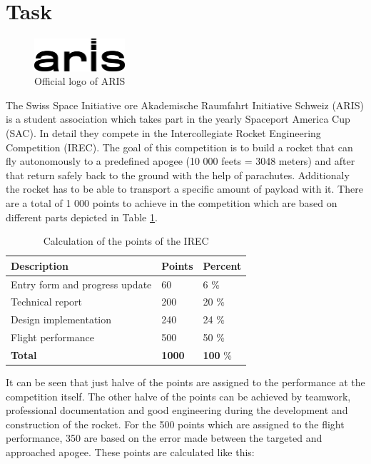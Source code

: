 
 \section{Task}

 \begin{figure}[h!]
 \centering
 \includegraphics[width=0.3\textwidth]{./Pictures/ARIS_logo.png}
 \caption{Official logo of ARIS \cite{ARIS}}
 \label{fig:ArisLogo}
\end{figure}

 The Swiss Space Initiative ore Akademische Raumfahrt Initiative Schweiz (ARIS) is a student association which takes part in the yearly Spaceport America Cup (SAC).
 In detail they compete in the Intercollegiate Rocket Engineering Competition (IREC).
 The goal of this competition is to build a rocket that can fly autonomously to a predefined apogee (10 000 feets = 3048 meters) and after that return safely back to the ground with the help of parachutes.
 Additionaly the rocket has to be able to transport a specific amount of payload with it.
 There are a total of 1 000 points to achieve in the competition which are based on different parts depicted in Table \ref{tab:CompetitionCalculation}.

\begin{table}[h]
\centering
\begin{tabular}{|l|l|l|}\hline
{\bf Description} & {\bf Points} & {\bf Percent}\\\hline
Entry form and progress update & 60 & 6 \% \\ \hline
Technical report & 200 & 20 \% \\ \hline
Design implementation & 240 & 24 \% \\ \hline
Flight performance & 500 & 50 \% \\ \hline
{\bf Total} & {\bf 1000} & {\bf 100} \% \\ \hline
\end{tabular}
\caption{Calculation of the points of the IREC}
\label{tab:CompetitionCalculation}
\end{table}


 It can be seen that just halve of the points are assigned to the performance at the competition itself.
 The other halve of the points can be achieved by teamwork, professional documentation and good engineering during the development and construction of the rocket.
 For the 500 points which are assigned to the flight performance, 350 are based on the error made between the targeted and approached apogee.
 These points are calculated like this:


